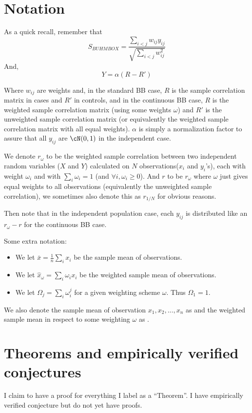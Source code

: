 \documentclass[11pt]{hw-template}
\begin{document}
\maketitle

\section*{Notation}
  
    As a quick recall, remember that 
  $$S_{BUHMBOX} = \frac{\sum_{i < j} w_{ij}y_{ij}}{\sqrt{\sum_{i<j}w_{ij}^2}}$$
  And,
  $$Y = \alpha(R-R')$$

  Where $w_{ij}$ are weights and, in the standard BB case, $R$ is the sample correlation matrix in cases and $R'$ in controls, and in the continuous BB case, $R$ is the weighted sample correlation matrix
  (using some weights $\omega$) and $R'$ is the unweighted sample correlation matrix (or equivalently the weighted sample correlation matrix with all equal weights). $\alpha$ is simply a normalization factor
  to assure that all $y_{ij}$ are $\cN(0, 1)$ in the independent case.

  We denote $r_\omega$ to be the weighted sample correlation between two independent random variables ($X$ and $Y$) calculated on $N$ observations($x_i$ and $y_i$'s), each with weight $\omega_i$ and with 
  $\sum_i \omega_i = 1$ (and $\forall i, \omega_i \geq 0$). And $r$ to
  be $r_\omega$ where $\omega$ just gives equal weights to all observations (equivalently the unweighted sample correlation), we sometimes also denote this as $r_{1/N}$ for obvious reasons.

  Then note that in the independent population case, each $y_{ij}$ is distributed like an $r_\omega - r$ for the continuous BB case. 
  
  Some extra notation:
  \begin{itemize}
    \item We let $\bar{x} = \frac{1}{n}\sum_i x_i$ be the sample mean of observations.
    \item We let $\hat{x}_{\omega} = \sum_i \omega_i x_i$ be the weighted sample mean of observations.
    \item We let $\Omega_j = \sum_i \omega_i^j$ for a given weighting scheme $\omega$. Thus $\Omega_1 = 1$. 
  \end{itemize}
  We also denote the sample mean of observation $x_1, x_2, ..., x_n$ as  and the weighted sample mean in respect to some weighting $\omega$ as 
  .
  

\section*{Theorems and empirically verified conjectures}
  I claim to have a proof for everything I label as a ``Theorem''. I have empirically verified conjecture but do not yet have proofs. 
\end{document}
